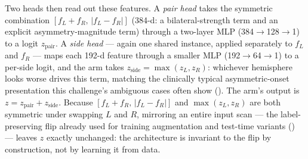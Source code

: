 \documentclass[10pt]{article}
\begin{document}
Two heads then read out these features. A \emph{pair head} takes the symmetric combination $[f_L+f_R,\,|f_L-f_R|]$ (384-d: a bilateral-strength term and an explicit asymmetry-magnitude term) through a two-layer MLP (384$\to$128$\to$1) to a logit $z_{\text{pair}}$. A \emph{side head} --- again one shared instance, applied separately to $f_L$ and $f_R$ --- maps each 192-d feature through a smaller MLP (192$\to$64$\to$1) to a per-side logit, and the arm takes $z_{\text{side}} = \max(z_L, z_R)$: whichever hemisphere looks worse drives this term, matching the clinically typical asymmetric-onset presentation this challenge's ambiguous cases often show (). The arm's output is $z = z_{\text{pair}} + z_{\text{side}}$. Because $[f_L+f_R,\,|f_L-f_R|]$ and $\max(z_L,z_R)$ are both symmetric under swapping $L$ and $R$, mirroring an entire input scan --- the label-preserving flip already used for training augmentation and test-time variants () --- leaves $z$ exactly unchanged: the architecture is invariant to the flip by construction, not by learning it from data.
\end{document}
